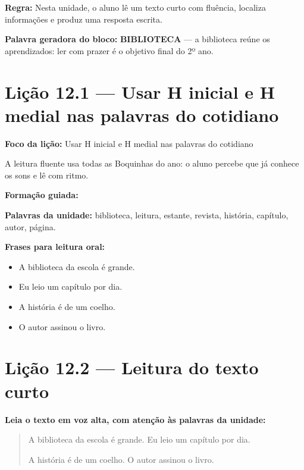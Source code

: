 \textbf{Regra:} Nesta unidade, o aluno lê um texto curto com fluência, localiza informações e produz uma resposta escrita.

\textbf{Palavra geradora do bloco:} \textbf{BIBLIOTECA} --- a biblioteca reúne os aprendizados: ler com prazer é o objetivo final do 2º ano.

\section{Lição 12.1 --- Usar H inicial e H medial nas palavras do cotidiano}

\textbf{Foco da lição:} Usar H inicial e H medial nas palavras do cotidiano


\begin{boquinha}
A leitura fluente usa todas as Boquinhas do ano: o aluno percebe que já conhece os sons e lê com ritmo.
\end{boquinha}

\noindent\textbf{Formação guiada:}

\begin{center}
\end{center}

\noindent\textbf{Palavras da unidade:} biblioteca, leitura, estante, revista, história, capítulo, autor, página.

\noindent\textbf{Frases para leitura oral:}
\begin{itemize}[leftmargin=1.6em]
  \item A biblioteca da escola é grande.
  \item Eu leio um capítulo por dia.
  \item A história é de um coelho.
  \item O autor assinou o livro.
\end{itemize}

\section{Lição 12.2 --- Leitura do texto curto}

\noindent\textbf{Leia o texto em voz alta, com atenção às palavras da unidade:}


\begin{quote}
A biblioteca da escola é grande. Eu leio um capítulo por dia.

A história é de um coelho. O autor assinou o livro.
\end{quote}

